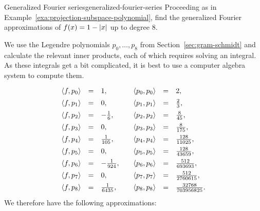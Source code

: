 \begin{example}{Generalized Fourier series}{generalized-fourier-series}
  Proceeding as in Example~\ref{exa:projection-subspace-polynomial},
  find the generalized Fourier approximations of $f(x)=1-\left|x\right|$ up
  to degree 8.
\end{example}

\begin{solution}
  We use the Legendre polynomials $p_0,\ldots,p_8$ from
  Section~\ref{sec:gram-schmidt} and calculate the relevant inner
  products, each of which requires solving an integral. As these
  integrals get a bit complicated, it is best to use a computer
  algebra system to compute them.
  \begin{equation*}
    \def\arraystretch{1.4}
    \begin{array}{rcl}
      \iprod{f,p_0} &=& 1, \\
      \iprod{f,p_1} &=& 0, \\
      \iprod{f,p_2} &=& -\frac{1}{6}, \\
      \iprod{f,p_3} &=& 0, \\
      \iprod{f,p_4} &=& \frac{1}{105}, \\
      \iprod{f,p_5} &=& 0, \\
      \iprod{f,p_6} &=& -\frac{1}{924}, \\
      \iprod{f,p_7} &=& 0, \\
      \iprod{f,p_8} &=& \frac{1}{6435}, \\
    \end{array}
    \quad
    \begin{array}{rcl}
      \iprod{p_0,p_0} &=& 2, \\
      \iprod{p_1,p_1} &=& \frac{2}{3}, \\
      \iprod{p_2,p_2} &=& \frac{8}{45}, \\
      \iprod{p_3,p_3} &=& \frac{8}{175}, \\
      \iprod{p_4,p_4} &=& \frac{128}{11025}, \\
      \iprod{p_5,p_5} &=& \frac{128}{43659}, \\
      \iprod{p_6,p_6} &=& \frac{512}{693693}, \\
      \iprod{p_7,p_7} &=& \frac{512}{2760615}, \\
      \iprod{p_8,p_8} &=& \frac{32768}{703956825}. \\
    \end{array}
  \end{equation*}
  We therefore have the following approximations:
  \begin{eqnarray*}

\end{eqnarray*}
\end{solution}
